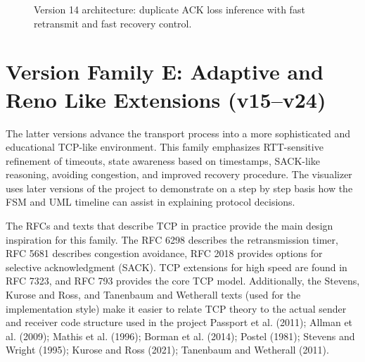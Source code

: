 \begin{figure}[h!]
{%
}
\caption{Version 14 architecture: duplicate ACK loss inference with fast retransmit and fast recovery control.
}
\label{fig:v14-architecture}
\end{figure}

\clearpage
\section{Version Family E: Adaptive and Reno Like Extensions (v15--v24)}
The latter versions advance the transport process into a more sophisticated and educational TCP-like environment. This family emphasizes RTT-sensitive refinement of timeouts, state awareness based on timestamps, SACK-like reasoning, avoiding congestion, and improved recovery procedure. The visualizer uses later versions of the project to demonstrate on a step by step basis how the FSM and UML timeline can assist in explaining protocol decisions.

The RFCs and texts that describe TCP in practice provide the main design inspiration for this family. The RFC 6298 describes the retransmission timer, RFC 5681 describes congestion avoidance, RFC 2018 provides options for selective acknowledgment (SACK). TCP extensions for high speed are found in RFC 7323, and RFC 793 provides the core TCP model. Additionally, the Stevens, Kurose and Ross, and Tanenbaum and Wetherall texts (used for the implementation style) make it easier to relate TCP theory to the actual sender and receiver code structure used in the project Passport et al. (2011); Allman et al. (2009); Mathis et al. (1996); Borman et al. (2014); Postel (1981); Stevens and Wright (1995); Kurose and Ross (2021); Tanenbaum and Wetherall (2011).

